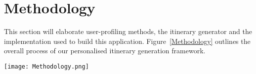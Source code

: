 \section{Methodology}
\label{MethodologyPage}

This section will elaborate user-profiling methods, 
the itinerary generator and the implementation used to build this application.
Figure~\ref{Methodology} outlines the overall process of our personalised
itinerary generation
framework. 

\begin{figure*}[h]
\centering
\texttt{[image: Methodology.png]}
\caption{Personalised itinerary generator}
\label{Methodology}
\end{figure*}






